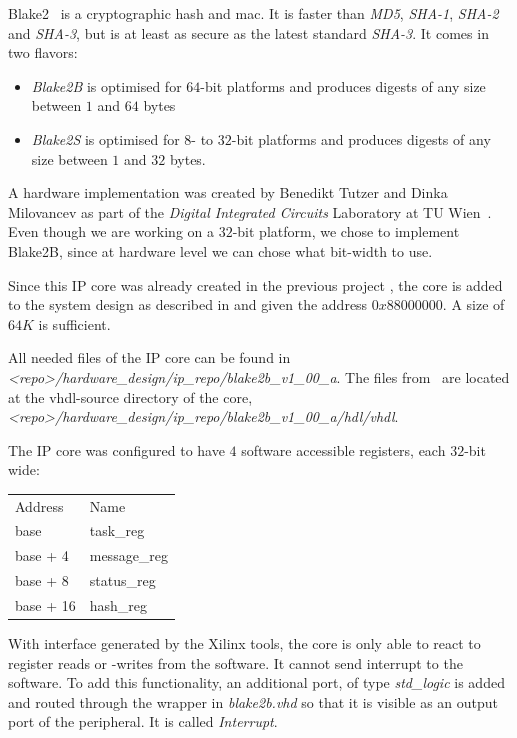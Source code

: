 Blake2~\cite{blake2} is a cryptographic hash and \gls{mac}. It is faster than
\emph{MD5}, \emph{SHA-1}, \emph{SHA-2} and \emph{SHA-3}, but is at least as
secure as the latest standard \emph{SHA-3}.
It comes in two flavors:
\begin{itemize}
	\item \emph{Blake2B} is optimised for $64$-bit platforms and produces
		digests of any size between $1$ and $64$ bytes
	\item \emph{Blake2S} is optimised for $8$- to $32$-bit platforms and
		produces digests of any size between $1$ and $32$ bytes.
\end{itemize}

A hardware implementation was created by Benedikt Tutzer and Dinka Milovancev as
part of the \emph{Digital Integrated Circuits} Laboratory at TU
Wien~\cite{blake2hardware}.
Even though we are working on a $32$-bit platform, we chose to implement
Blake2B, since at hardware level we can chose what bit-width to use.

Since this IP core was already created in the previous project \cite{oldrepo}, the core is added to the system design as described in
 and given the address $0x88000000$. A size of
$64K$ is sufficient.

All needed files of the IP core can be found in \emph{<repo>/hardware\_design/ip_repo/blake2b\_v1\_00\_a}.
The files from~\cite{blake2hardware} are located at the vhdl-source directory
of the core,\\
\emph{<repo>/hardware\_design/ip_repo/blake2b\_v1\_00\_a/hdl/vhdl}.

The IP core was configured to have $4$ software accessible registers, each $32$-bit wide:

\begin{tabular}{ll}
	Address & Name \\
	base     & task\_reg\\
	base + 4 & message\_reg\\
	base + 8 & status\_reg\\
	base + 16 & hash\_reg\\
\end{tabular}
\medbreak

With interface generated by the Xilinx tools, the core is only able to react to
register reads or -writes from the software.
It cannot send interrupt to the software.
To add this functionality, an additional port, of type \emph{std\_logic} is
added and routed through the wrapper in \emph{blake2b.vhd} so that it is
visible as an output port of the peripheral.
It is called \emph{Interrupt}.

